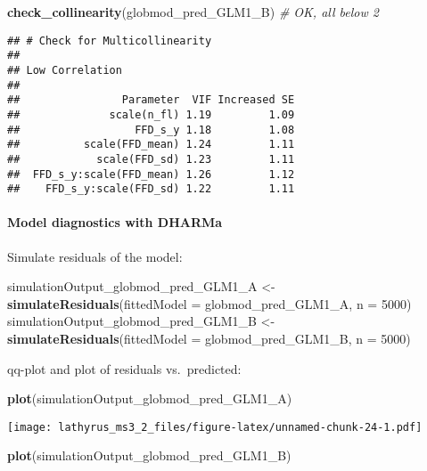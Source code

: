 \documentclass[
]{article}
\newenvironment{Shaded}{\begin{snugshade}}{\end{snugshade}}
\newcommand{\CommentTok}[1]{\textcolor[rgb]{0.56,0.35,0.01}{\textit{#1}}}
\newcommand{\DataTypeTok}[1]{\textcolor[rgb]{0.13,0.29,0.53}{#1}}
\newcommand{\DecValTok}[1]{\textcolor[rgb]{0.00,0.00,0.81}{#1}}
\newcommand{\KeywordTok}[1]{\textcolor[rgb]{0.13,0.29,0.53}{\textbf{#1}}}
\newcommand{\NormalTok}[1]{#1}
\newcommand{\StringTok}[1]{\textcolor[rgb]{0.31,0.60,0.02}{#1}}
\begin{document}
\begin{Shaded}
\begin{Highlighting}[]
\KeywordTok{check_collinearity}\NormalTok{(globmod_pred_GLM1_B) }\CommentTok{# OK, all below 2}
\end{Highlighting}
\end{Shaded}

\begin{verbatim}
## # Check for Multicollinearity
## 
## Low Correlation
## 
##                Parameter  VIF Increased SE
##              scale(n_fl) 1.19         1.09
##                  FFD_s_y 1.18         1.08
##          scale(FFD_mean) 1.24         1.11
##            scale(FFD_sd) 1.23         1.11
##  FFD_s_y:scale(FFD_mean) 1.26         1.12
##    FFD_s_y:scale(FFD_sd) 1.22         1.11
\end{verbatim}

\hypertarget{model-diagnostics-with-dharma-1}{%
\paragraph{Model diagnostics with
DHARMa}\label{model-diagnostics-with-dharma-1}}

Simulate residuals of the model:

\begin{Shaded}
\begin{Highlighting}[]
\NormalTok{simulationOutput_globmod_pred_GLM1_A <-}\StringTok{ }
\StringTok{  }\KeywordTok{simulateResiduals}\NormalTok{(}\DataTypeTok{fittedModel =}\NormalTok{ globmod_pred_GLM1_A, }\DataTypeTok{n =} \DecValTok{5000}\NormalTok{)}
\NormalTok{simulationOutput_globmod_pred_GLM1_B <-}\StringTok{ }
\StringTok{  }\KeywordTok{simulateResiduals}\NormalTok{(}\DataTypeTok{fittedModel =}\NormalTok{ globmod_pred_GLM1_B, }\DataTypeTok{n =} \DecValTok{5000}\NormalTok{)}
\end{Highlighting}
\end{Shaded}

qq-plot and plot of residuals vs.~predicted:

\begin{Shaded}
\begin{Highlighting}[]
\KeywordTok{plot}\NormalTok{(simulationOutput_globmod_pred_GLM1_A)}
\end{Highlighting}
\end{Shaded}

\texttt{[image: lathyrus\_ms3\_2\_files/figure-latex/unnamed-chunk-24-1.pdf]}

\begin{Shaded}
\begin{Highlighting}[]
\KeywordTok{plot}\NormalTok{(simulationOutput_globmod_pred_GLM1_B)}
\end{Highlighting}
\end{Shaded}
\end{document}
